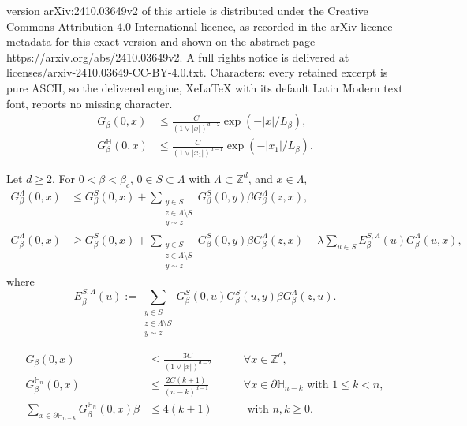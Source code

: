 \documentclass[10pt,a4paper]{amsart}
\begin{document}
version arXiv:2410.03649v2 of this article is distributed under the Creative Commons Attribution 4.0 International licence, as recorded in the arXiv licence metadata for this exact version and shown on the abstract page https://arxiv.org/abs/2410.03649v2. A full rights notice is delivered at licenses/arxiv-2410.03649-CC-BY-4.0.txt. Characters: every retained excerpt is pure ASCII, so the delivered engine, XeLaTeX with its default Latin Modern text font, reports no missing character.
\begin{align}
\label{eq:bound full plane}
G_\beta(0,x)&\le \frac{C}{(1\vee |x|)^{d-2}}\exp(-|x|/L_\beta),\\
\label{eq:bound half plane} G_\beta^\mathbb H(0,x)&\le \frac{C}{(1\vee|x_1|)^{d-1}}\exp(-|x_1|/L_\beta).
\end{align}

\begin{Lem}\label{Lem: Simon-Lieb WSAW} Let $d\geq 2$. For $0<\beta<\beta_c$, $0\in S\subset \Lambda$ with $\Lambda\subset \mathbb Z^d$, and $x\in \Lambda$, 
\begin{align}\label{eq:SL}
G_\beta^\Lambda(0,x)&\le G_\beta^S(0,x)+ \sum_{\substack{y\in S\\ z\in \Lambda\setminus S\\ y\sim z}}G_\beta^S(0,y)\beta G_\beta^\Lambda(z,x),\\
G_\beta^\Lambda(0,x)&\ge G_\beta^S(0,x)+\sum_{\substack{y\in S\\ z\in \Lambda\setminus S\\ y\sim z}}G_\beta^S(0,y)\beta G_\beta^\Lambda(z,x)- \lambda \sum_{u\in S}E_\beta^{S,\Lambda}(u)G_\beta^\Lambda(u,x),\label{eq:reversed SL}
\end{align}
where 
\begin{equation}
E_\beta^{S,\Lambda}(u):=\sum_{\substack{y \in S\\ z\in \Lambda\setminus S\\ y\sim z}}G_\beta^S(0,u)G_\beta^S(u,y) \beta G_\beta^\Lambda(z,u).
\end{equation}
\end{Lem}

\begin{align}\label{eq: full plane estimate from half plane}
    G_\beta(0,x)&\le \frac{3C}{(1\vee|x|)^{d-2}}\qquad&\forall x\in \mathbb Z^d,\\ \label{eq: half plane at distance $k$ from half space}
    G_\beta^{\mathbb H_n}(0,x)&\le \frac{2C(k+1)}{(n-k)^{d-1}}\qquad&\forall x\in \partial\mathbb H_{n-k}\text{ with }1\le k<n,\\ \label{eq: sum at distance k from halfplane}
    \sum_{x\in \partial\mathbb H_{n-k}}G_\beta^{\mathbb H_n}(0,x)\beta&\le 4(k+1)\qquad&\text{ with }n,k\ge0.
\end{align}
\end{document}
